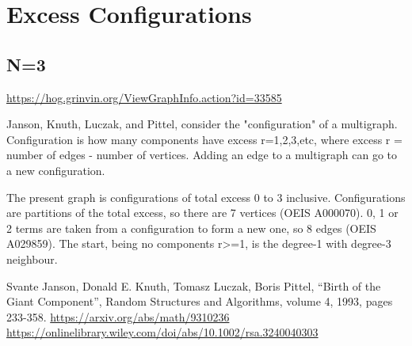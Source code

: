 \documentclass{article}
\begin{document}
\clearpage
\section{Excess Configurations}

\subsection{N=3}
\url{https://hog.grinvin.org/ViewGraphInfo.action?id=33585}

Janson, Knuth, Luczak, and Pittel, consider the "configuration" of a
multigraph.  Configuration is how many components have excess
r=1,2,3,etc, where excess r = number of edges - number of vertices.
Adding an edge to a multigraph can go to a new configuration.

The present graph is configurations of total excess 0 to 3 inclusive.
Configurations are partitions of the total excess, so there are 7
vertices (OEIS A000070).  0, 1 or 2 terms are taken from a
configuration to form a new one, so 8 edges (OEIS A029859).  The
start, being no components r>=1, is the degree-1 with degree-3
neighbour.

Svante Janson, Donald E. Knuth, Tomasz Luczak, Boris Pittel, ``Birth
of the Giant Component'', Random Structures and Algorithms, volume 4,
1993, pages 233-358.
\newline
\url{https://arxiv.org/abs/math/9310236}
\newline
\url{https://onlinelibrary.wiley.com/doi/abs/10.1002/rsa.3240040303}

\begin{center}
\end{center}
\end{document}
